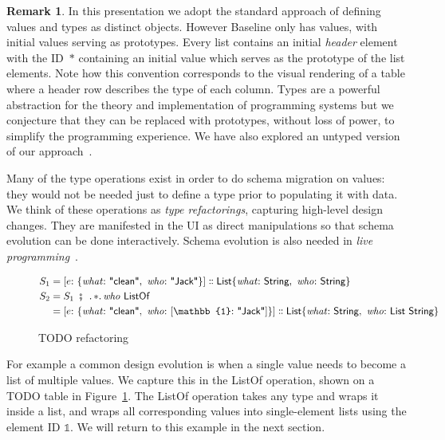 \documentclass[english,submission]{programming}
\theoremstyle{definition}
\newtheorem*{remark}{Remark}
\newcommand{\mathbox}[1]{\colorbox{black!10}{$#1$}}
\DeclareMathOperator{\exec}{\ \fatsemi\ \ }
\newcommand{\is}{{:}\ }
\newcommand{\comma}{,\ }
\newcommand{\isa}{\dblcolon}
\newcommand{\quotedstring}[1]{\textsf{\textquotedbl{#1}\textquotedbl}}
\begin{document}
\begin{remark}
In this presentation we adopt the standard approach of defining values and types as distinct objects. However Baseline only has values, with initial values serving as prototypes. Every list contains an initial \textit{header} element with the ID~\mathbox{*} containing an initial value which serves as the prototype of the list elements. Note how this convention corresponds to the visual rendering of a table where a header row describes the type of each column. Types are a powerful abstraction for the theory and implementation of programming systems but we conjecture that they can be replaced with prototypes, without loss of power, to simplify the programming experience. We have also explored an untyped version of our approach~\cite{denicek}.
\end{remark}

Many of the type operations exist in order to do schema migration on values: they would not be needed just to define a type prior to populating it with data. We think of these operations as \textit{type refactorings}, capturing high-level design changes. They are manifested in the UI as direct manipulations so that schema evolution can be done interactively. Schema evolution is also needed in \textit{live programming}~\cite{challenge-problems}.
\begin{figure}[h]
\begin{align*}
  S_1 &= [
    e \is \{ \mathit{what}\is \quotedstring{clean}\comma  \mathit{who}\is \quotedstring{Jack} \}
    ] \isa
    \textsf{List}\{ \mathit{what}\is \textsf{String}\comma \mathit{who}\is \textsf{String} \}\\
S_2 &= S_1 \exec \ldotp *\ldotp \mathit{who} \textsf{ ListOf } \\
 &= [
    e \is \{ \mathit{what}\is \quotedstring{clean}\comma  \mathit{who}\is [\mathbb{1}\is \quotedstring{Jack}] \}
    ] \isa
    \textsf{List}\{ \mathit{what}\is \textsf{String}\comma  \mathit{who}\is \textsf{List String} \}\\
\end{align*}
\vspace{-40pt}
\caption{TODO refactoring}
\label{fig:TODO-refactor}
\end{figure}

For example a common design evolution is when a single value needs to become a list of multiple values. We capture this in the \textsf{ListOf} operation, shown on a TODO table in Figure~\ref{fig:TODO-refactor}.
The \textsf{ListOf} operation takes any type and wraps it inside a list, and wraps all corresponding values into single-element lists using the element ID $\mathbb{1}$. We will return to this example in the next section.
\end{document}
